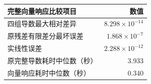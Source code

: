 \begin{tabular}{lr}
\toprule
完整向量响应比较项目 & 数值 \\
\midrule
四组导数最大相对差异 & $8.298\times10^{-14}$ \\
原残差有限差分最坏误差 & $1.868\times10^{-7}$ \\
实线性误差 & $2.288\times10^{-12}$ \\
原完整导数耗时中位数（秒） & 3.933 \\
向量响应耗时中位数（秒） & 0.340 \\
\bottomrule
\end{tabular}
